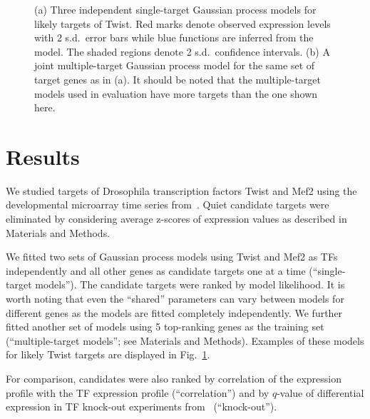 \documentclass{pnastwo}
\begin{document}
\begin{article}
\begin{figure}[tb]
  \caption{(a) Three independent single-target Gaussian process models
    for likely targets of Twist. Red marks denote observed expression
    levels with 2 s.d.\ error bars while blue functions are inferred
    from the model.  The shaded regions denote 2 s.d.\ confidence
    intervals. (b) A joint multiple-target Gaussian process model for
    the same set of target genes as in (a). It should be noted that
    the multiple-target models used in evaluation have more targets
    than the one shown here.}
  \label{fig:gpdisim_models}
\end{figure}

\section{Results}

We studied targets of Drosophila transcription factors Twist and Mef2
using the developmental microarray time series
from~\cite{Tomancak2002}.  Quiet candidate targets were eliminated by
considering average z-scores of expression values as described in
Materials and Methods.

We fitted two sets of Gaussian process models using Twist and Mef2 as
TFs independently and all other genes as candidate targets one at a
time (``single-target models'').  The candidate targets were ranked by
model likelihood.  It is worth noting that even the ``shared''
parameters can vary between models for different genes as the models
are fitted completely independently.
We further fitted another set of models using 5
top-ranking genes as the training set (``multiple-target models''; see
Materials and Methods).  Examples of these models for likely Twist
targets are displayed in Fig.~\ref{fig:gpdisim_models}.

For comparison, candidates were also ranked by correlation of the
expression profile with the TF expression profile (``correlation'')
and by $q$-value of differential expression in TF knock-out
experiments from~\cite{Sandmann2006a,Sandmann2007a} (``knock-out'').


\end{article}
\end{document}
